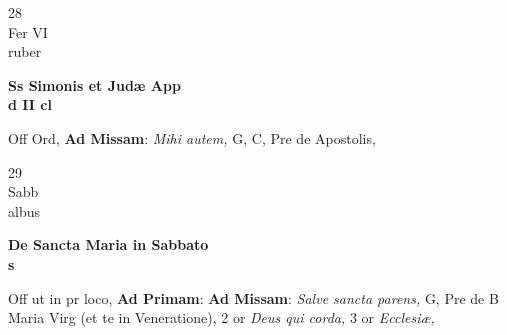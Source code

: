 \documentclass[10pt, openany]{book}
\begin{document}
        \begin{center}
            \begin{minipage}{3.5in}
                \vspace{2em}
                \begin{minipage}{0.5in}
                    {\Huge 28} \\
                    {\normalsize Fer VI} \\
                    {\normalsize ruber}
                \end{minipage}
                \begin{minipage}{3.0in}
                    \textbf{ \large Ss Simonis et Judæ App \\
                    \textnormal{\normalsize d II cl}} \\ 
                \end{minipage}
                \begin{justify}Off Ord, \textbf{Ad Missam}: \textit{Mihi autem,} G, C, Pre de Apostolis,   
                \end{justify}
            \end{minipage}
        \end{center}
    
        \begin{center}
            \begin{minipage}{3.5in}
                \vspace{2em}
                \begin{minipage}{0.5in}
                    {\Huge 29} \\
                    {\normalsize Sabb} \\
                    {\normalsize albus}
                \end{minipage}
                \begin{minipage}{3.0in}
                    \textbf{ \large De Sancta Maria in Sabbato \\
                    \textnormal{\normalsize s}} \\ 
                \end{minipage}
                \begin{justify}Off ut in pr loco, \textbf{Ad Primam}: \textbf{Ad Missam}: \textit{Salve sancta parens,} G, Pre de B Maria Virg (et te in Veneratione), 2 or \textit{Deus qui corda,} 3 or \textit{Ecclesiæ,}   
                \end{justify}
            \end{minipage}
        \end{center}
    
\end{document}
